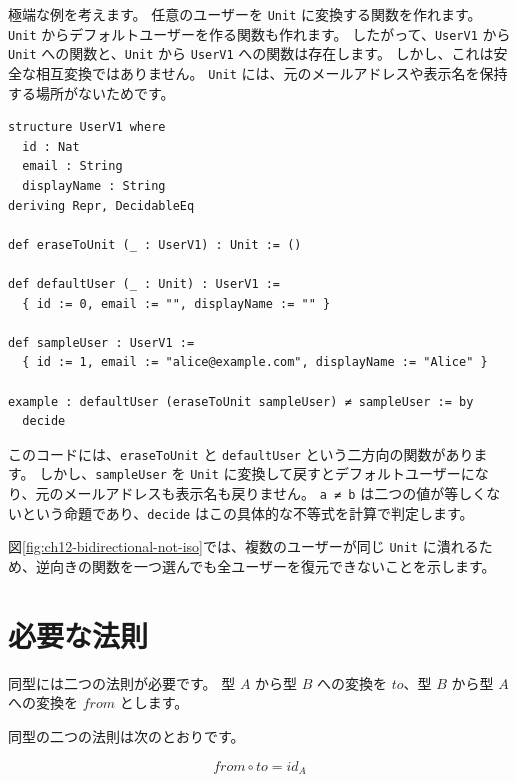 極端な例を考えます。
任意のユーザーを \texttt{Unit} に変換する関数を作れます。
\texttt{Unit} からデフォルトユーザーを作る関数も作れます。
したがって、\texttt{UserV1} から \texttt{Unit} への関数と、\texttt{Unit} から \texttt{UserV1} への関数は存在します。
しかし、これは安全な相互変換ではありません。
\texttt{Unit} には、元のメールアドレスや表示名を保持する場所がないためです。

\begin{listing}[htbp]
\begin{verbatim}
structure UserV1 where
  id : Nat
  email : String
  displayName : String
deriving Repr, DecidableEq

def eraseToUnit (_ : UserV1) : Unit := ()

def defaultUser (_ : Unit) : UserV1 :=
  { id := 0, email := "", displayName := "" }

def sampleUser : UserV1 :=
  { id := 1, email := "alice@example.com", displayName := "Alice" }

example : defaultUser (eraseToUnit sampleUser) ≠ sampleUser := by
  decide
\end{verbatim}
\caption{\texttt{eraseToUnit} と \texttt{defaultUser}}
\label{lst:ch12_bidirectional_not_iso}
\end{listing}

このコードには、\texttt{eraseToUnit} と \texttt{defaultUser} という二方向の関数があります。
しかし、\texttt{sampleUser} を \texttt{Unit} に変換して戻すとデフォルトユーザーになり、元のメールアドレスも表示名も戻りません。
\texttt{a ≠ b} は二つの値が等しくないという命題であり、\texttt{decide} はこの具体的な不等式を計算で判定します。

図\ref{fig:ch12-bidirectional-not-iso}では、複数のユーザーが同じ \texttt{Unit} に潰れるため、逆向きの関数を一つ選んでも全ユーザーを復元できないことを示します。


\section{必要な法則}
\label{sec:ch12-laws}

同型には二つの法則が必要です。
型 $A$ から型 $B$ への変換を $\mathit{to}$、型 $B$ から型 $A$ への変換を $\mathit{from}$ とします。

同型の二つの法則は次のとおりです。

\[
  \mathit{from} \circ \mathit{to} = \mathit{id}_A
\]

